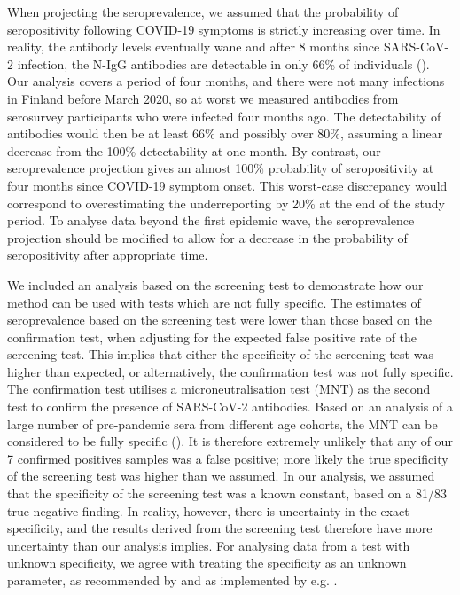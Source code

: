 \documentclass[aoas]{imsart}
\begin{document}
When projecting the seroprevalence, we assumed that the probability of seropositivity following COVID-19 symptoms is strictly increasing over time. In reality, the antibody levels eventually wane and after 8 months since SARS-CoV-2 infection, the N-IgG antibodies are detectable in only 66\% of individuals (\cite{haveri2021}). Our analysis covers a period of four months, and there were not many infections in Finland before March 2020, so at worst we measured antibodies from serosurvey participants who were infected four months ago. The detectability of antibodies would then be at least 66\% and possibly over 80\%, assuming a linear decrease from the 100\% detectability at one month. By contrast, our seroprevalence projection gives an almost 100\% probability of seropositivity at four months since COVID-19 symptom onset. This worst-case discrepancy would correspond to overestimating the underreporting by 20\% at the end of the study period. To analyse data beyond the first epidemic wave, the seroprevalence projection should be modified to allow for a decrease in the probability of seropositivity after appropriate time.

We included an analysis based on the screening test to demonstrate how our method can be used with tests which are not fully specific. The estimates of seroprevalence based on the screening test were lower than those based on the confirmation test, when adjusting for the expected false positive rate of the screening test. This implies that either the specificity of the screening test was higher than expected, or alternatively, the confirmation test was not fully specific. The confirmation test utilises a microneutralisation test (MNT) as the second test to confirm the presence of SARS-CoV-2 antibodies. Based on an analysis of a large number of pre-pandemic sera from different age cohorts, the MNT can be considered to be fully specific (\cite{Ekstrom2021}). It is therefore extremely unlikely that any of our 7 confirmed positives samples was a false positive; more likely the true specificity of the screening test was higher than we assumed. In our analysis, we assumed that the specificity of the screening test was a known constant, based on a 81/83 true negative finding. In reality, however, there is uncertainty in the exact specificity, and the results derived from the screening test therefore have more uncertainty than our analysis implies. For analysing data from a test with unknown specificity, we agree with treating the specificity as an unknown parameter, as recommended by \cite{gelman2020} and as implemented by e.g. \cite{Stringhini2020}. 
\end{document}
